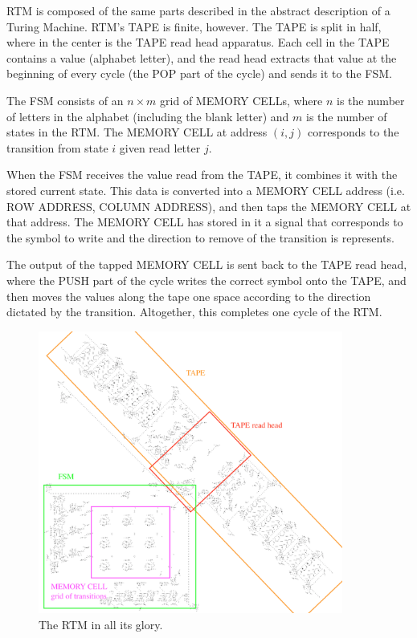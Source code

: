 \documentclass{article}
\begin{document}
RTM is composed of the same parts described in the abstract description of a Turing Machine. RTM's TAPE is finite, however. The TAPE is split in half, where in the center is the TAPE read head apparatus. Each cell in the TAPE contains a value (alphabet letter), and the read head extracts that value at the beginning of every cycle (the POP part of the cycle) and sends it to the FSM.





The FSM consists of an $  n \times m  $ grid of MEMORY CELLs, where $  n  $ is the number of letters in the alphabet (including the blank letter) and $  m  $ is the number of states in the RTM. The MEMORY CELL at address $  (i,j)  $ corresponds to the transition from state $  i  $ given read letter $  j  $.





When the FSM receives the value read from the TAPE, it combines it with the stored current state. This data is converted into a MEMORY CELL address (i.e. ROW ADDRESS, COLUMN ADDRESS), and then taps the MEMORY CELL at that address. The MEMORY CELL has stored in it a signal that corresponds to the symbol to write and the direction to remove of the transition is represents.





The output of the tapped MEMORY CELL is sent back to the TAPE read head, where the PUSH part of the cycle writes the correct symbol onto the TAPE, and then moves the values along the tape one space according to the direction dictated by the transition. Altogether, this completes one cycle of the RTM.



\begin{figure}[h]
\centering
\includegraphics[width=10cm,keepaspectratio]{images/RTM.png}
\captionsetup{labelformat=empty} \caption{The RTM in all its glory.}
\end{figure}
\end{document}
